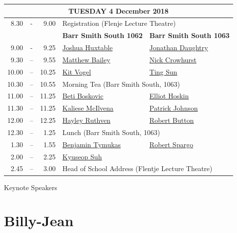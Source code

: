 \documentclass[twoside,14pt,a4paper,notitlepage]{memoir}
\begin{document}
\pagebreak
\vspace*{0cm}
\begin{center}
\begin{tabular}{rcr|p{3.6cm}|p{3.6cm}}
\multicolumn{5}{c}{{\large TUESDAY 4 December 2018}} \\ \hline
8.30 & - & 9.00 & \multicolumn{2}{l}{Registration (Flenje Lecture Theatre)} \\ \hline
 & & & \textbf{Barr Smith South 1062} & \textbf{Barr Smith South 1063} \\ \hline
9.00 & - & 9.25 &
 \hyperref[aut:huxtable]{Joshua Huxtable} &
 \hyperref[aut:daughtry]{Jonathan Daughtry} \\ \hline
9.30 & – & 9.55 &
 \hyperref[aut:bailey]{Matthew Bailey} &
 \hyperref[aut:crowhurst]{Nick Crowhurst} \\ \hline
10.00 & – & 10.25 &
\hyperref[aut:vogel]{Kit Vogel} &
\hyperref[aut:sun]{Ting Sun} \\ \hline
10.30 & – & 10.55 & \multicolumn{2}{l}{Morning Tea (Barr Smith South, 1063)} \\ \hline
11.00 & – & 11.25 & 
 \hyperref[aut:boskovic]{Beti Boskovic} &
 \hyperref[aut:hoskin]{Elliot Hoskin} \\ \hline
11.30 & – & 11.25 &
 \hyperref[aut:mcilvena]{Kaliese McIlvena} &
 \hyperref[aut:johnson]{Patrick Johnson} \\ \hline
12.00 & – & 12.25 &
 \hyperref[aut:ruthven]{Hayley Ruthven} &
 \hyperref[aut:button]{Robert Button} \\ \hline
12.30 & – & 1.25 & \multicolumn{2}{l}{Lunch (Barr Smith South, 1063)} \\ \hline
1.30 & – & 1.55 &
 \hyperref[aut:tymukas]{Benjamin Tymukas} &
 \hyperref[aut:spargo]{Robert Spargo} \\ \hline
2.00 & – & 2.25 & 
\hyperref[aut:suh]{Kyuseop Suh} & \\ \hline
2.45 & – & 3.00 & \multicolumn{2}{l}{Head of School Address (Flentje Lecture Theatre)} \\ \hline
\end{tabular}
\end{center}



\pagebreak
\vspace*{2cm}
{\Huge Keynote Speakers}
\vspace{2cm}

\section*{Billy-Jean}
\end{document}
